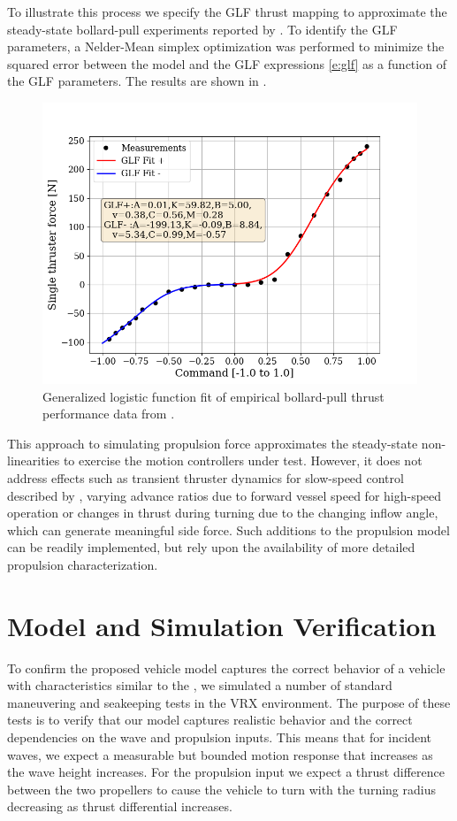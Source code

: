 \documentclass[utf8]{frontiersSCNS} %
\begin{document}
To illustrate this process we specify the GLF thrust mapping to approximate the  steady-state bollard-pull experiments reported by \citet{sarda16station}. To identify the GLF parameters, a Nelder-Mean simplex optimization was performed to minimize the squared error between the model and the GLF expressions \eqref{e:glf} as a function of the GLF parameters. The results are shown in .
\begin{figure}[h]
  \centering
  \includegraphics[width=\SFc\textwidth]{src/wamv_glf_annote.png}
  \caption{Generalized logistic function fit of empirical  bollard-pull thrust performance data from \citep{sarda16station}.}
  \label{f:fit}
\end{figure}

This approach to simulating propulsion force approximates the steady-state non-linearities to exercise the motion controllers under test. However, it does not address effects such as transient thruster dynamics for slow-speed control described by \citet{whitcomb99development}, varying advance ratios due to forward vessel speed for high-speed operation or changes in thrust during turning due to the changing inflow angle, which can generate meaningful side force. Such additions to the propulsion model can be readily implemented, but rely upon the availability of more detailed propulsion characterization.
%
\section{Model and Simulation Verification}
%
To confirm the proposed vehicle model captures the correct behavior of a vehicle with characteristics similar to the \wamv{}, we simulated a number of standard maneuvering and seakeeping tests in the VRX environment. The purpose of these tests is to verify that our model captures realistic behavior and the correct dependencies on the wave and propulsion inputs. This means that for incident waves, we expect a measurable but bounded motion response that increases as the wave height increases. For the propulsion input we expect a thrust difference between the two propellers to cause the vehicle to turn with the turning radius decreasing as thrust differential increases.
\end{document}
